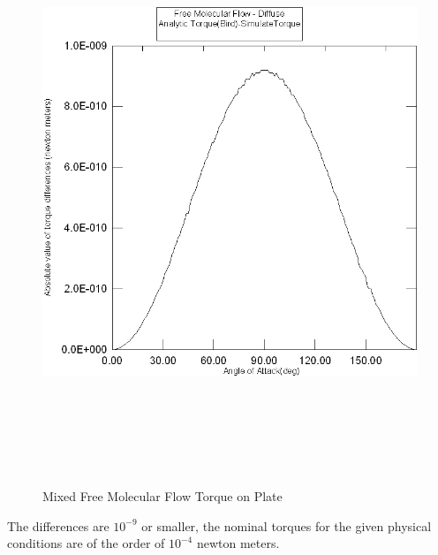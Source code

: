 \begin{description}
\begin{figure}[hbpt]
\includegraphics [height=175mm]{figs/torque_diff.jpg}
\caption{Mixed Free Molecular Flow Torque on Plate}
\label{fig:11}
\end{figure}
The differences are $10^{-9}$ or smaller, the nominal torques for the
given physical conditions are of the order of $10^{-4}$ newton meters.
\end{description}

